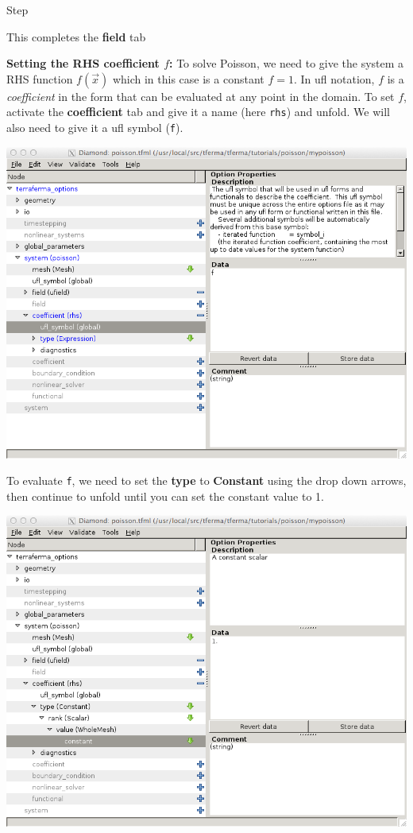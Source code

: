 \begin{steps}{Step}
\begin{center}
\end{center}
This completes the \textbf{field} tab
\item \textbf{Setting the RHS coefficient $f$:} To solve Poisson, we
  need to give the system a RHS function $f(\vec{x})$ which in this
  case is a constant $f=1$.  In ufl notation,  $f$ is a
  \emph{coefficient} in the form that can be evaluated at any point in
  the domain.  To set $f$, activate the \textbf{coefficient} tab and
  give it a name (here \texttt{rhs}) and unfold. We will also need to
  give it a  ufl symbol (\texttt{f}). 
\begin{center}
    \includegraphics[width=\diamondwidth]{figures/screendumps/diamond_poisson_10b.png}
\end{center}
 To evaluate \texttt{f}, we need to set the \textbf{type} to
\textbf{Constant} using the drop down arrows, then continue to unfold
until you can set the constant value to 1.
\begin{center}
    \includegraphics[width=\diamondwidth]{figures/screendumps/diamond_poisson_10c.png}

\end{center}
\end{steps}
